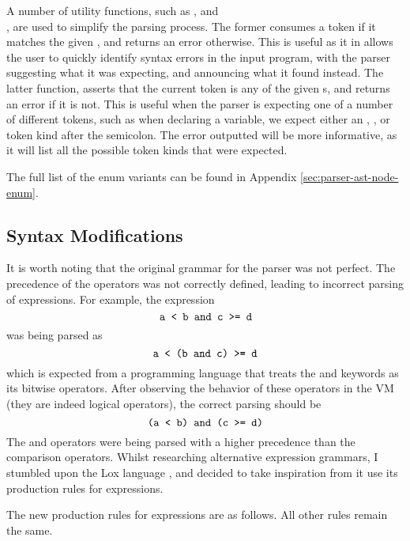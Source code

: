A number of utility functions, such as , and
\\, are used to
simplify the parsing process. The former consumes a token if it matches the
given , and returns an error otherwise. This is useful as it in
allows the user to quickly identify syntax errors in the input program, with the
parser suggesting what it was expecting, and announcing what it found instead.
The latter function, asserts that the current token is any of the given
s, and returns an error if it is not. This is useful when the
parser is expecting one of a number of different tokens, such as when declaring
a variable, we expect either an , ,  or
 token kind after the semicolon. The error outputted will be more
informative, as it will list all the possible token kinds that were expected.



The full list of the  enum variants can be found in Appendix
\ref{sec:parser-ast-node-enum}.

\subsection{Syntax Modifications}

It is worth noting that the original grammar for the parser was not perfect. The
precedence of the operators was not correctly defined, leading to incorrect
parsing of expressions.  For example, the
expression $$\texttt{a < b and c >= d}$$ was being parsed as $$\texttt{a < (b and c)
                >= d}$$ which is expected from a programming language that treats the
 and  keywords as its bitwise operators.  After
observing the behavior of these operators in the VM (they are indeed logical
operators), the correct parsing should be $$\texttt{(a < b) and (c >= d)}$$ The
 and  operators were being parsed with a higher
precedence than the comparison operators. Whilst researching alternative
expression grammars, I stumbled upon the Lox language \cite{nystrom2021crafting}, and
decided to take inspiration from it use its production rules for expressions.

The new production rules for expressions are as follows. All other rules remain
the same.

